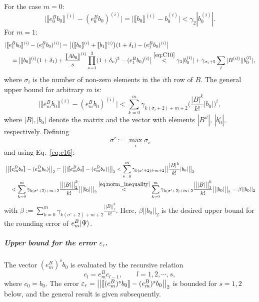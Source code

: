 For the case $m=0$:
\begin{equation}
    \big|\llbracket e^B_0b_0 \rrbracket^{(i)} -(e^B_0b_0)^{(i)} \big|
    =\big|\llbracket b_0\rrbracket ^{(i)} -b_0 ^{(i)}\big|<\gamma_2|b_0^{(i)}|.
\end{equation}
For $m=1$:
\begin{align}
\label{eq:c17}
    &|\llbracket e^B_1b_0 \rrbracket^{(i)}-(e^B_1b_0 )^{(i)}|
    =\big|\big(\llbracket b_0\rrbracket ^{(i)}+\llbracket 
    b_1\rrbracket^{(i)}\big)(1+\delta_1)-(e^B_1b_0 )^{(i)}\big| \\
\nonumber    &\quad=\big|\llbracket b_0\rrbracket ^{(i)}(1+\delta_1)+\frac{\llbracket Ab_0\rrbracket}{s}^{(i)}\prod_{\nu=1}^3(1+\delta_\nu)^3-(e^B_1b_0 )^{(i)}\big| \overset{\eqref{eq:C10}}{<}\gamma_3|b_0^{(i)}| + \gamma_{\sigma_i+5}\sum_l|B^{(il)}||b_0^{(l)}|,
\end{align}
where $\sigma_i$ is the number of non-zero elements in the $i$th row of $B$.
The general upper bound for arbitrary $m$ is:
\begin{equation}
\label{eq:c16}
    \big|\llbracket e^B_mb_0 \rrbracket^{(i)} -(e^B_mb_0 )^{(i)}\big|<\sum_{k=0}^m\gamma_{k(\sigma_i+2)+m+2}\big(\frac{|B|^k}{k!}|b_0|\big)^i,
\end{equation}
where $|B|,|b_0|$ denote the matrix and the vector with elements $|B^{il}|$, $|b_0^{i}|$, respectively. Defining
\begin{equation}
\label{eq:sigmapdef}
    \sigma':=\max_i \sigma_i
\end{equation} 
and using Eq.~\eqref{eq:c16}:
\begin{align}
\nonumber    & \left|\left|\llbracket e^B_mb_0 \rrbracket -(e^B_mb_0 )\right|\right|_2=\big|\big||\llbracket e^B_mb_0 \rrbracket -(e^B_mb_0 )|\big|\big|_2<\sum_{k=0}^m\gamma_{k(\sigma'+2)+m+2}\big|\big|\frac{|B|^k}{k!}|b_0|\big|\big|_2\\
\label{eq:B23} &\quad <\sum_{k=0}^m\gamma_{k(\sigma'+2)+m+2}\frac{\big|\big||B|\big|\big|_2^k}{k!}\big|\big||b_0|\big|\big|_2
 \overset{\eqref{eq:norm_inequality}}{<}\sum_{k=0}^m\gamma_{k(\sigma'+2)+m+2}\frac{\big|\big||B|\big|\big|_1^k}{k!}\big|\big||b_0|\big|\big|_2=\beta||b_0||_2
\end{align}
with $\beta:=\sum_{k=0}^m\gamma_{k(\sigma'+2)+m+2}\frac{||B||_1^k}{k!}$. Here, $\beta||b_0||_2$ is the desired upper bound for the rounding error of $e^B_m|\Psi\rangle$. 

\subparagraph{Upper bound for the error $\varepsilon_r$.}
\label{par:upper_bound_eps_r}
The vector $(e^B_m)^sb_0 $ is evaluated by the recursive relation
\begin{equation}
\label{eq:recursive_relation2}
    c_l=e^B_m c_{l-1},\qquad l=1,2,\cdots,s,
\end{equation}
where $c_0=b_0$. 
The error $\varepsilon_r=\left|\left|\llbracket (e^B_m)^sb_0\rrbracket-(e^B_m)^sb_0 \right|\right|_2$ is bounded for $s=1,2$ below, and the general result is given subsequently. 

